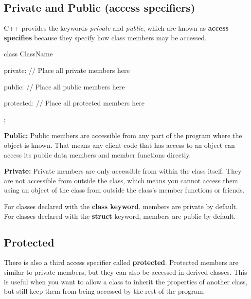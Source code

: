 \documentclass{report}
\begin{document}
    \bigbreak \noindent 
    \subsection{Private and Public (access specifiers)}
    \bigbreak \noindent 
    C++ provides the keywords \textit{private} and \textit{public}, which are known as \textbf{access specifies} because they specify how class members may be accessed. 
    \bigbreak \noindent 
    
    \begin{cppcode}
class ClassName {
    private:
        // Place all private members here

    public: 
        // Place all public members here

    protected:
        // Place all protected members here
};
    \end{cppcode}
    
    \bigbreak \noindent 
    \textbf{Public:}
    \bigbreak \noindent 
    Public members are accessible from any part of the program where the object is known. That means any client code that has access to an object can access its public data members and member functions directly.

    \bigbreak \noindent 
    \textbf{Private:}
    \bigbreak \noindent 
    Private members are only accessible from within the class itself. They are not accessible from outside the class, which means you cannot access them using an object of the class from outside the class's member functions or friends. 
    \bigbreak \noindent 
    \begin{notebox}
        For classes declared with the \textbf{class keyword}, members are private by default. For classes declared with the \textbf{struct} keyword, members are public by default.
    \end{notebox}
    
    \bigbreak \noindent 
    \subsection{Protected}
    \bigbreak \noindent 
    There is also a third access specifier called \textbf{protected}. Protected members are similar to private members, but they can also be accessed in derived classes. This is useful when you want to allow a class to inherit the properties of another class, but still keep them from being accessed by the rest of the program.

    \bigbreak \noindent 
\end{document}

